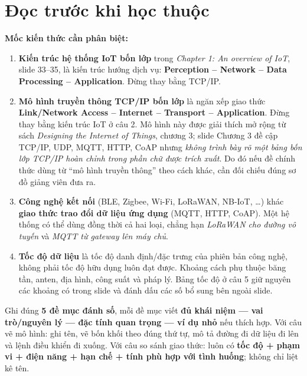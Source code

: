 \documentclass[11pt,a4paper]{article}
\newcommand{\kw}[1]{\textbf{#1}}
\begin{document}
\section*{Đọc trước khi học thuộc}
\textbf{Mốc kiến thức cần phân biệt:}
\begin{enumerate}
\item \kw{Kiến trúc hệ thống IoT bốn lớp} trong \emph{Chapter 1: An overview of IoT}, slide 33--35, là kiến trúc hướng dịch vụ: \kw{Perception -- Network -- Data Processing -- Application}. Đừng thay bằng TCP/IP.
\item \kw{Mô hình truyền thông TCP/IP bốn lớp} là ngăn xếp giao thức \kw{Link/Network Access -- Internet -- Transport -- Application}. Đừng thay bằng kiến trúc IoT ở câu 2. Mô hình này được giải thích mở rộng từ sách \emph{Designing the Internet of Things}, chương 3; slide Chương 3 đề cập TCP/IP, UDP, MQTT, HTTP, CoAP nhưng \emph{không trình bày rõ một bảng bốn lớp TCP/IP hoàn chỉnh trong phần chữ được trích xuất}. Do đó nếu đề chính thức dùng từ ``mô hình truyền thông'' theo cách khác, cần đối chiếu đúng sơ đồ giảng viên đưa ra.
\item \kw{Công nghệ kết nối} (BLE, Zigbee, Wi-Fi, LoRaWAN, NB-IoT, \ldots) khác \kw{giao thức trao đổi dữ liệu ứng dụng} (MQTT, HTTP, CoAP). Một hệ thống có thể dùng đồng thời cả hai loại, chẳng hạn \emph{LoRaWAN cho đường vô tuyến} và \emph{MQTT từ gateway lên máy chủ}.
\item \kw{Tốc độ dữ liệu} là tốc độ danh định/đặc trưng của phiên bản công nghệ, không phải tốc độ hữu dụng luôn đạt được. Khoảng cách phụ thuộc băng tần, anten, địa hình, công suất và pháp lý. Bảng tốc độ ở câu 5 giữ nguyên các khoảng có trong slide và đánh dấu các số bổ sung bên ngoài slide.
\end{enumerate}
\begin{notesbox}[title={Chiến thuật làm một câu tự luận 5 điểm}]
Ghi đúng \textbf{5 đề mục đánh số}, mỗi đề mục viết \textbf{đủ khái niệm --- vai trò/nguyên lý --- đặc tính quan trọng --- ví dụ nhỏ} nếu thích hợp. Với câu vẽ mô hình: ghi tên, vẽ bốn khối theo đúng thứ tự, mô tả đường đi dữ liệu đi lên và lệnh điều khiển đi xuống. Với câu so sánh giao thức: luôn có \textbf{tốc độ + phạm vi + điện năng + hạn chế + tính phù hợp với tình huống}; không chỉ liệt kê tên.
\end{notesbox}

\clearpage
\end{document}
